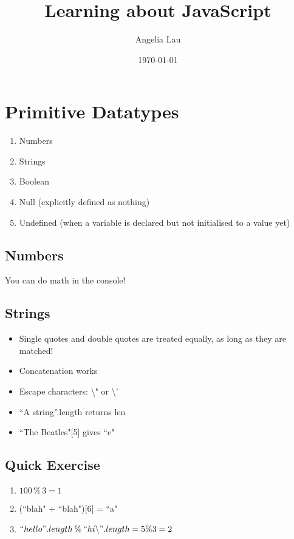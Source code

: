 \documentclass[11pt, a4paper]{article}   	%
\title{Learning about JavaScript}
\author{Angelia Lau}
\date{\today}
\begin{document}
\maketitle

\section{Primitive Datatypes}
\begin{enumerate}
	\item Numbers
	\item Strings
	\item Boolean
	\item Null (explicitly defined as nothing)
	\item Undefined	(when a variable is declared but not initialised to a value yet)
\end{enumerate}

\subsection{Numbers}
You can do math in the console! 

\subsection{Strings }
\begin{itemize}
	\item Single quotes and double quotes are treated equally, as long as they are matched! 
	\item Concatenation works 
	\item Escape characters: \textbackslash " or \textbackslash '
	\item ``A string''.length returns len %
	\item ``The Beatles"[5] gives ``e"
\end{itemize}

\subsection{Quick Exercise}
\begin{enumerate}
	\item $100 \mathbin{\%} 3 = 1$
	\item (``blah" + ``blah")[6] = ``a"
	\item $``hello".length \mathbin{\%} ``hi\backslash".length = 5 \% 3 = 2$
\end{enumerate}
\end{document}
